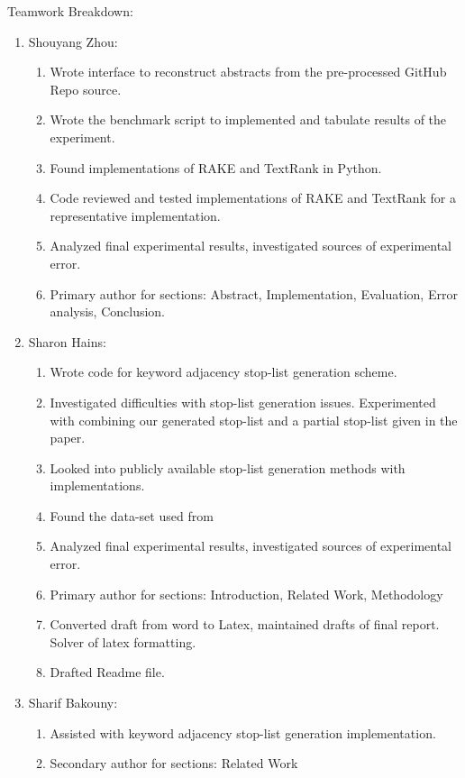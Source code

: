 \documentclass[11pt,a4paper]{article}
\begin{document}
Teamwork Breakdown: 
\begin{enumerate}
	\small \itemsep0em 

	\item Shouyang Zhou:
	\begin{enumerate}
		\item Wrote interface to reconstruct abstracts from the pre-processed GitHub Repo source.
		\item Wrote the benchmark script to implemented and tabulate results of the experiment.
		\item Found implementations of RAKE and TextRank in Python.
		\item Code reviewed and tested implementations of RAKE and TextRank for a representative implementation.
		\item Analyzed final experimental results, investigated sources of experimental error.
		\item Primary author for sections: Abstract, Implementation, Evaluation, Error analysis, Conclusion.

	\end{enumerate}

	\item Sharon Hains:
	\begin{enumerate}
		\item Wrote code for keyword adjacency stop-list generation scheme.
		\item Investigated difficulties with stop-list generation issues. Experimented with combining our generated stop-list and a partial stop-list given in the paper.
		\item Looked into publicly available stop-list generation methods with implementations. 
		\item Found the data-set used from \citet{hulth-2003-improved}
		\item Analyzed final experimental results, investigated sources of experimental error.
		\item Primary author for sections: Introduction, Related Work, Methodology
		\item Converted draft from word to Latex, maintained drafts of final report. Solver of latex formatting.
		\item Drafted Readme file.
	\end{enumerate}

	\item Sharif Bakouny:
	\begin{enumerate}
		\item Assisted with keyword adjacency stop-list generation implementation.
		\item Secondary author for sections: Related Work
	\end{enumerate}	

\normalsize
\end{enumerate}  
 
\end{document}
